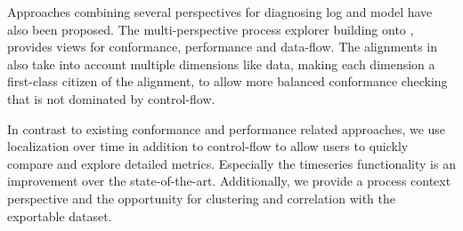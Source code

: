 Approaches combining several perspectives for diagnosing log and model have also been proposed. The multi-perspective process explorer \cite{mannhardt2015multi} building onto \cite{mannhardt2016balanced}, provides views for conformance, performance and data-flow. The alignments in \cite{mannhardt2016balanced} also take into account multiple dimensions like data, making each dimension a first-class citizen of the alignment, to allow more balanced conformance checking that is not dominated by control-flow.

In contrast to existing conformance and performance related approaches, we use localization over time in addition to control-flow to allow users to quickly compare and explore detailed metrics. Especially the timeseries functionality is an improvement over the state-of-the-art. Additionally, we provide a process context perspective and the opportunity for clustering and correlation with the exportable dataset.